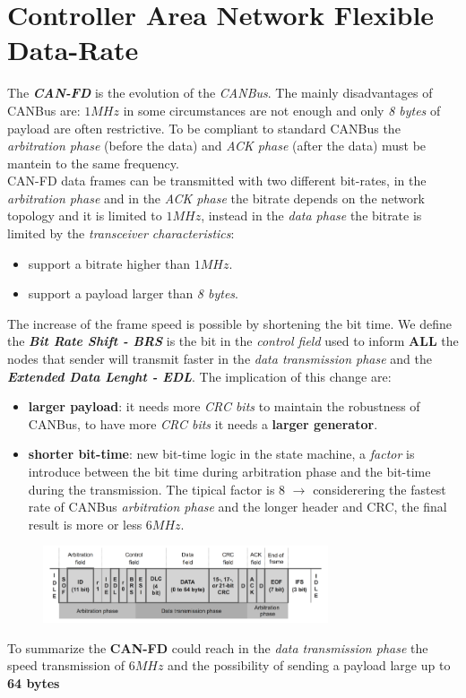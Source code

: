 \section{Controller Area Network Flexible Data-Rate}
The \textbf{\textit{CAN-FD}} is the evolution of the \textit{CANBus}. The mainly disadvantages of CANBus are: $1MHz$ in some circumstances are not enough and only \textit{8 bytes} of payload are often restrictive. To be compliant to standard CANBus the \textit{arbitration phase} (before the data) and \textit{ACK phase} (after the data) must be mantein to the same frequency. \\
CAN-FD data frames can be transmitted with two different bit-rates, in the \textit{arbitration phase} and in the \textit{ACK phase} the bitrate depends on the network topology and it is limited to $1MHz$, instead in the \textit{data phase} the bitrate is limited by the \textit{transceiver characteristics}:
\begin{itemize}[nosep]
    \item support a bitrate higher than $1MHz$.
    \item support a payload larger than \textit{8 bytes}.
\end{itemize}
The increase of the frame speed is possible by shortening the bit time. We define the \textbf{\textit{Bit Rate Shift - BRS}} is the bit in the \textit{control field} used to inform \textbf{ALL} the nodes that sender will transmit faster in the \textit{data transmission phase} and the \textbf{\textit{Extended Data Lenght - EDL}}. The implication of this change are:
\begin{itemize}[nosep]
    \item \textbf{larger payload}: it needs more \textit{CRC bits} to maintain the robustness of CANBus, to have more \textit{CRC bits} it needs a \textbf{larger generator}.
    \item \textbf{shorter bit-time}: new bit-time logic in the state machine, a \textit{factor} is introduce between the bit time during arbitration phase and the bit-time during the transmission. The tipical factor is 8 $\rightarrow$ considerering the fastest rate of CANBus \textit{arbitration phase} and the longer header and CRC, the final result is more or less $6MHz$.
\end{itemize}
\begin{figure}[h]
    \centering
    \label{img:canfd}
    \includegraphics[width=0.75\textwidth]{img/can_fd}
\end{figure}
To summarize the \textbf{CAN-FD} could reach in the \textit{data transmission phase} the speed transmission of $6MHz$ and the possibility of sending a payload large up to \textbf{64 bytes}

